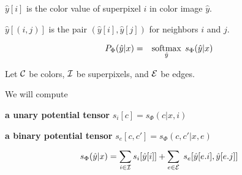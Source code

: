 \vfill
$\hat{y}[i]$ is the color value of superpixel $i$ in color image $\hat{y}$.

\vfill
$\hat{y}[(i,j)]$ is the pair $(\hat{y}[i],\hat{y}[j])$ for neighbors $i$ and $j$.


\begin{eqnarray*}
P_\Phi(\hat{y}|x) & = & \operatorname*{softmax}_{\hat{y}}\;s_\Phi(\hat{y}|x)
\end{eqnarray*}

\vfill
Let ${\cal C}$ be colors, ${\cal I}$ be superpixels, and ${\cal E}$ be edges.

\vfill
We will compute

\vfill {\bf a unary potential tensor} $s_i[c] = s_\Phi(c|x,i)$

\vfill
{\bf a binary potential tensor} $s_e[c,c'] = s_\Phi(c,c'|x,e)$

\vfill
$$s_\Phi(\hat{y}|x) = \sum_{i \in {\cal I}} s_i[\hat{y}[i]] + \sum_{e \in {\cal E}}\;s_e[\hat{y}[e.i],\hat{y}[e.j]]$$
